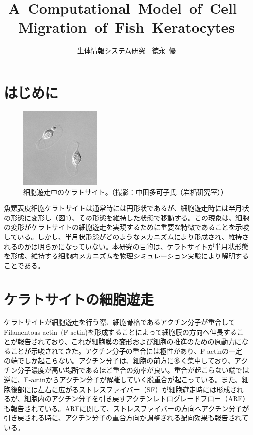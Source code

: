 \documentclass[10pt,twocolumn,a4j]{jarticle}
\title{A~Computational~Model~of~Cell~Migration~of~Fish~Keratocytes}
\author{生体情報システム研究~~徳永~優}
\date{}
\begin{document}
\maketitle
\section{はじめに}
\begin{figure}[tbp]
\centering
\includegraphics[width=4cm]{kera.eps}
\caption{細胞遊走中のケラトサイト。（撮影：中田多可子氏（岩楯研究室））}
\label{fig:kera}
\end{figure}
魚類表皮細胞ケラトサイトは通常時には円形状であるが、細胞遊走時には半月状の形態に変形し（図\ref{fig:kera}）、その形態を維持した状態で移動する。この現象は、細胞の変形がケラトサイトの細胞遊走を実現するために重要な特徴であることを示唆している。しかし、半月状形態がどのようなメカニズムにより形成され、維持されるのかは明らかになっていない。本研究の目的は、ケラトサイトが半月状形態を形成、維持する細胞内メカニズムを物理シミュレーション実験により解明することである。
\section{ケラトサイトの細胞遊走}
ケラトサイトが細胞遊走を行う際、細胞骨格であるアクチン分子が重合してFilamentous actin~(F-actin)を形成することによって細胞膜の方向へ伸長することが報告されており、これが細胞膜の変形および細胞の推進のための原動力になることが示唆されてきた\cite{svitkina1997analysis}。アクチン分子の重合には極性があり、F-actinの一定の端でしか起こらない。アクチン分子は、細胞の前方に多く集中しており、アクチン分子濃度が高い場所であるほど重合の効率が良い\cite{yumura1998spatiotemporal}。重合が起こらない端では逆に、F-actinからアクチン分子が解離していく脱重合が起こっている。また、細胞後部には左右に広がるストレスファイバー（SF）が細胞遊走時には形成されるが、細胞内のアクチン分子を引き戻すアクチンレトログレードフロー（ARF）も報告されている\cite{nakashima2015molecular}。ARFに関して、ストレスファイバーの方向へアクチン分子が引き戻される時に、アクチン分子の重合方向が調整される配向効果も報告されている\cite{swaminathan2017actin}。
\end{document}
